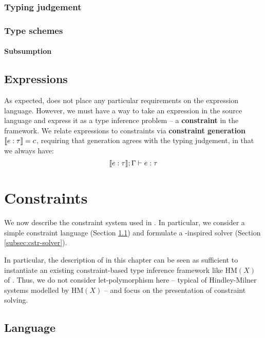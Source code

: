 \subsubsection{Typing judgement}

\subsubsection{Type schemes}

\paragraph{Subsumption}

\subsection{Expressions}
\label{subsec:expressions}

As expected, \inference{} does not place any particular requirements on the expression language. However, we must have a way to take an expression in the source language and express it as a type inference problem -- a \textbf{constraint} in the framework. 
We relate expressions to constraints via \textbf{constraint generation} $\denot{e : \tau} = c$, requiring that generation agrees with the typing judgement, in that we always have: 
$$\denot{e : \tau}; \Gamma \vdash e : \tau $$

\section{Constraints}
\label{sec:constraints}

We now describe the constraint system used in \inference{}. In particular, we consider a simple constraint language (Section \ref{subsec:cstr-language}) and formulate a \mlstruct{}-inspired solver (Section \ref{subsec:cstr-solver}). 

In particular, the description of \inference{} in this chapter can be seen as sufficient to instantiate an existing constraint-based type inference framework like $\mathrm{HM}(X)$ of \textcite{constraint-based-hm}. Thus, we do not consider let-polymorphism here -- typical of Hindley-Milner systems modelled by $\mathrm{HM}(X)$ -- and focus on the presentation of constraint solving. 

\subsection{Language}
\label{subsec:cstr-language}

